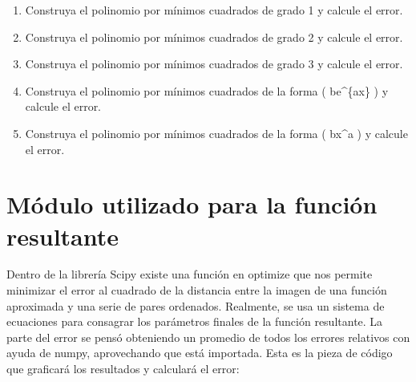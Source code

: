 \documentclass[
  letterpaper,
  DIV=11,
  numbers=noendperiod]{scrartcl}
\begin{document}
\begin{enumerate}
\def\labelenumi{\alph{enumi}.}
\item
  Construya el polinomio por mínimos cuadrados de grado 1 y calcule el
  error.
\item
  Construya el polinomio por mínimos cuadrados de grado 2 y calcule el
  error.
\item
  Construya el polinomio por mínimos cuadrados de grado 3 y calcule el
  error.
\item
  Construya el polinomio por mínimos cuadrados de la forma (
  be\^{}\{ax\} ) y calcule el error.
\item
  Construya el polinomio por mínimos cuadrados de la forma ( bx\^{}a ) y
  calcule el error.
\end{enumerate}

\section{Módulo utilizado para la función
resultante}\label{muxf3dulo-utilizado-para-la-funciuxf3n-resultante}

Dentro de la librería Scipy existe una función en optimize que nos
permite minimizar el error al cuadrado de la distancia entre la imagen
de una función aproximada y una serie de pares ordenados. Realmente, se
usa un sistema de ecuaciones para consagrar los parámetros finales de la
función resultante. La parte del error se pensó obteniendo un promedio
de todos los errores relativos con ayuda de numpy, aprovechando que está
importada. Esta es la pieza de código que graficará los resultados y
calculará el error:
\end{document}
